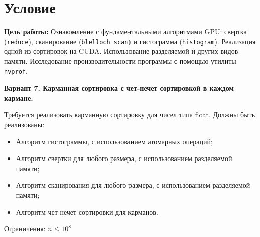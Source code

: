 \section{Условие}
{\bfseries Цель работы:} Ознакомление с фундаментальными алгоритмами GPU: свертка (\texttt{reduce}), сканирование (\texttt{blelloch scan}) и гистограмма (\texttt{histogram}). Реализация одной из сортировок на CUDA. Использование разделяемой и других видов памяти. Исследование производительности программы с помощью утилиты \texttt{nvprof}.

{\bfseries Вариант 7. Карманная сортировка с чет-нечет сортировкой в каждом кармане.}

Требуется реализовать карманную сортировку для чисел типа float.
Должны быть реализованы:
\begin{itemize}
    \item Алгоритм гистограммы, с использованием атомарных операций;
    \item Алгоритм свертки для любого размера, с использованием разделяемой памяти;
    \item Алгоритм сканирования для любого размера, с использованием разделяемой памяти;
    \item Алгоритм чет-нечет сортировки для карманов.
\end{itemize}
Ограничения: $n \le {10}^8$
